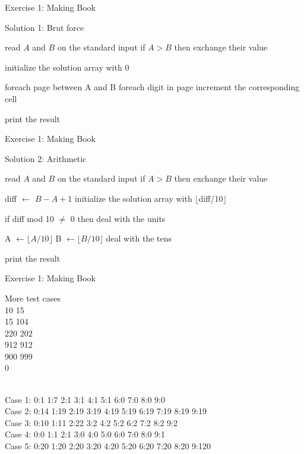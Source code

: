 \documentclass[handout]{beamer}
\begin{document}
\begin{frame}[fragile]{Exercise 1: Making Book}

  \begin{code}{Solution 1: Brut force}
    \begin{PseudoCode}
read $A$ and $B$ on the standard input
if $A > B$ then 
    exchange their value

initialize the solution array with 0

foreach page between A and B
    foreach digit in page
        increment the corresponding cell

print the result
    \end{PseudoCode}
  \end{code}
\end{frame}

\begin{frame}[fragile]{Exercise 1: Making Book}
  
  \begin{code}{Solution 2: Arithmetic}
    \begin{PseudoCode}
read $A$ and $B$ on the standard input
if $A > B$ then exchange their value

diff $\leftarrow$ $B - A + 1$
initialize the solution array with $\lfloor$diff/10$\rfloor$
    
if diff mod 10 $\neq$ 0 then
    deal with the units
    
A $\leftarrow \lfloor A / 10 \rfloor$
B $\leftarrow \lfloor B / 10 \rfloor$
deal with the tens

print the result
    \end{PseudoCode}
  \end{code}
\end{frame}

\begin{frame}{Exercise 1: Making Book}

  \begin{exampleblock}{More test cases}
    \\
    10 15\\
    15 104\\
    220 202\\
    912 912\\
    900 999\\
    0
    
    \medskip
    \\
    Case 1: 0:1 1:7 2:1 3:1 4:1 5:1 6:0 7:0 8:0 9:0\\
    Case 2: 0:14 1:19 2:19 3:19 4:19 5:19 6:19 7:19 8:19 9:19\\
    Case 3: 0:10 1:11 2:22 3:2 4:2 5:2 6:2 7:2 8:2 9:2\\
    Case 4: 0:0 1:1 2:1 3:0 4:0 5:0 6:0 7:0 8:0 9:1\\
    Case 5: 0:20 1:20 2:20 3:20 4:20 5:20 6:20 7:20 8:20 9:120
  \end{exampleblock}
\end{frame}
\end{document}
